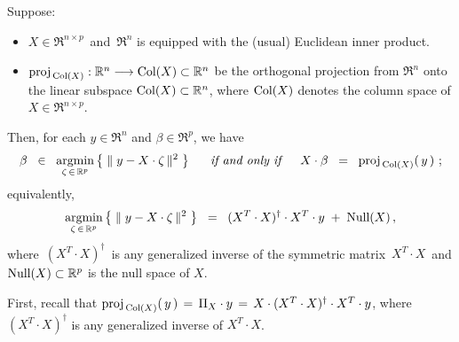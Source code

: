 \begin{proposition}
\mbox{}\vskip 0.1cm\noindent
Suppose:
\begin{itemize}
\item
	$X \in \Re^{n \times p}$\, and \,$\Re^{n}$ is equipped with the (usual) Euclidean inner product.
\item
	$\textnormal{proj}_{\,\textnormal{Col}(X)} : \mathbb{R}^{n} \longrightarrow \textnormal{Col}(X) \subset \mathbb{R}^{n}$
	be the orthogonal projection from $\Re^{n}$ onto the linear subspace $\textnormal{Col}(X) \subset \mathbb{R}^{n}$,
	where $\textnormal{Col}(X)$ denotes the column space of $X \in \Re^{n \times p}$.
\end{itemize}
Then, for each $y \in \Re^{n}$ and $\beta \in \Re^{p}$, we have
\begin{equation*}
\beta \;\;\in\;\; \underset{\zeta\,\in\,\mathbb{R}^{p}}{\textnormal{argmin}}\left\{\;\Vert\;y - X \cdot \zeta\,\Vert^{2}\;\right\}
\quad\;\;\textnormal{\it if and only if}\quad\;\;
X\cdot\beta \;\; = \;\; \textnormal{proj}_{\,\textnormal{Col}(X)}\!\left(\,y\,\right)\,;
\end{equation*}
equivalently,
\begin{equation*}
\underset{\zeta\,\in\,\mathbb{R}^{p}}{\textnormal{argmin}}\left\{\;\Vert\;y - X \cdot \zeta\,\Vert^{2}\;\right\}
\;\; = \;\;
	(X^{T} \cdot X)^{\dagger} \cdot X^{T} \cdot y
	\; + \;
	\textnormal{Null}(X)\,,
\end{equation*}
where \,$(X^{T} \cdot X)^{\dagger}$\, is any generalized inverse of the symmetric matrix
\,$X^{T} \cdot X$\, and $\textnormal{Null}(X) \subset \mathbb{R}^{p}$ is the null space of $X$. 
\end{proposition}
\proof
First, recall that $\textnormal{proj}_{\,\textnormal{Col}(X)}(\,y\,) \,=\, \Pi_{X} \cdot y \,=\, X\cdot(X^{T}\cdot X)^{\dagger}\cdot X^{T} \cdot y$,
where $(X^{T} \cdot X)^{\dagger}$ is any generalized inverse of $X^{T} \cdot X$.

